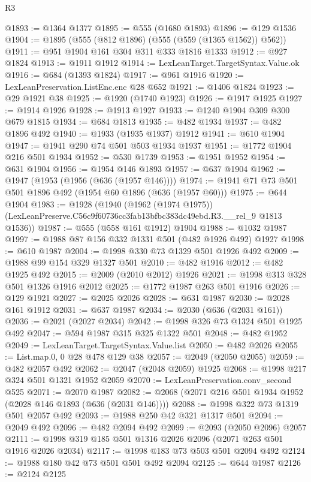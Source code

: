 \begin{lexlean}{R3}
\begin{coremodule}
@1893 := @1364 @1377
@1895 := @555 (@1680 @1893)
@1896 := @129 @1536
@1904 := @1895 (@555 (@812 @1896) (@555 (@559 (@1365 @1562)) @562))
@1911 := @951 @1904 @161 @304 @311 @333 @1816 @1333
@1912 := @927 @1824
@1913 := @1911 @1912
@1914 := LexLeanTarget.TargetSyntax.Value.ok
@1916 := @684 (@1393 @1824)
@1917 := @961 @1916
@1920 := LexLeanPreservation.ListEnc.enc @28 @652
@1921 := @1406 @1824
@1923 := @29 @1921 @38
@1925 := @1920 (@1740 @1923)
@1926 := @1917 @1925
@1927 := @1914 @1926
@1928 := @1913 @1927
@1933 := @1240 @1904 @309 @300 @679 @1815
@1934 := @684 @1813
@1935 := @482 @1934
@1937 := @482 @1896 @492
@1940 := @1933 (@1935 @1937) @1912
@1941 := @610 @1904
@1947 := @1941 @290 @74 @501 @503 @1934 @1937
@1951 := @1772 @1904 @216 @501 @1934
@1952 := @530 @1739
@1953 := @1951 @1952
@1954 := @631 @1904
@1956 := @1954 @146 @1893
@1957 := @637 @1904
@1962 := @1947 (@1953 (@1956 (@636 (@1957 @146))))
@1974 := @1941 @71 @73 @501 @501 @1896 @492 (@1954 @60 @1896 (@636 (@1957 @60)))
@1975 := @644 @1904
@1983 := @1928
    (@1940
      (@1962 (@1974 @1975))
      (LexLeanPreserve.C56c9f60736cc3fab13bfbc383dc49ebd.R3.__rel_9 @1813 @1536))
@1987 := @555 (@558 @161 @1912) @1904
@1988 := @1032 @1987
@1997 := @1988 @87 @156 @332 @1331 @501 (@482 @1926 @492) @1927
@1998 := @610 @1987
@2004 := @1998 @330 @73 @1329 @501 @1926 @492
@2009 := @1988 @99 @154 @329 @1327 @501
@2010 := @482 @1916
@2012 := @482 @1925 @492
@2015 := @2009 (@2010 @2012) @1926
@2021 := @1998 @313 @328 @501 @1326 @1916 @2012
@2025 := @1772 @1987 @263 @501 @1916
@2026 := @129 @1921
@2027 := @2025 @2026
@2028 := @631 @1987
@2030 := @2028 @161 @1912
@2031 := @637 @1987
@2034 := @2030 (@636 (@2031 @161))
@2036 := @2021 (@2027 @2034)
@2042 := @1998 @326 @73 @1324 @501 @1925 @492
@2047 := @594 @1987 @315 @325 @1322 @501
@2048 := @482 @1952
@2049 := LexLeanTarget.TargetSyntax.Value.list
@2050 := @482 @2026
@2055 := List.map.{0, 0} @28 @478 @129 @38
@2057 := @2049 (@2050 @2055)
@2059 := @482 @2057 @492
@2062 := @2047 (@2048 @2059) @1925
@2068 := @1998 @217 @324 @501 @1321 @1952 @2059
@2070 := LexLeanPreservation.conv_second @525
@2071 := @2070 @1987
@2082 := @2068 (@2071 @216 @501 @1934 @1952 (@2028 @146 @1893 (@636 (@2031 @146))))
@2088 := @1998 @322 @73 @1319 @501 @2057 @492
@2093 := @1988 @250 @42 @321 @1317 @501
@2094 := @2049 @492
@2096 := @482 @2094 @492
@2099 := @2093 (@2050 @2096) @2057
@2111 := @1998 @319 @185 @501 @1316 @2026 @2096 (@2071 @263 @501 @1916 @2026 @2034)
@2117 := @1998 @183 @73 @503 @501 @2094 @492
@2124 := @1988 @180 @42 @73 @501 @501 @492 @2094
@2125 := @644 @1987
@2126 := @2124 @2125

\end{coremodule}
\end{lexlean}
